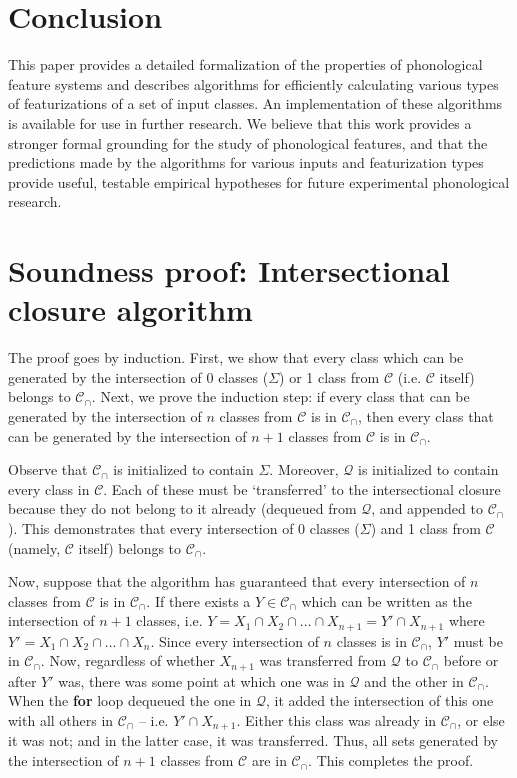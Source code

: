 \documentclass[11pt, oneside]{article}   	%
\begin{document}
\section{Conclusion}

This paper provides a detailed formalization of the properties of phonological feature systems and describes algorithms for efficiently calculating various types of featurizations of a set of input classes. An implementation of these algorithms is available for use in further research. We believe that this work provides a stronger formal grounding for the study of phonological features, and that the predictions made by the algorithms for various inputs and featurization types provide useful, testable empirical hypotheses for future experimental phonological research.

\appendix

\section{Soundness proof: Intersectional closure algorithm}

The proof goes by induction. First, we show that every class which can be generated by the intersection of $0$ classes ($\Sigma$) or 1 class from $\mathcal C$ (i.e. $\mathcal C$ itself) belongs to $\mathcal C_\cap$. Next, we prove the induction step: if every class that can be generated by the intersection of $n$ classes from $\mathcal C$ is in $\mathcal C_\cap$, then every class that can be generated by the intersection of $n+1$ classes from $\mathcal C$ is in $\mathcal C_\cap$.

Observe that $\mathcal C_\cap$ is initialized to contain $\Sigma$. Moreover, $\mathcal Q$ is initialized to contain every class in $\mathcal C$. Each of these must be `transferred' to the intersectional closure because they do not belong to it already (dequeued from $\mathcal Q$, and appended to $\mathcal C_\cap$). This demonstrates that every intersection of 0 classes ($\Sigma$) and 1 class from $\mathcal C$ (namely, $\mathcal C$ itself) belongs to $\mathcal C_\cap$.

Now, suppose that the algorithm has guaranteed that every intersection of $n$ classes from $\mathcal C$ is in $\mathcal C_\cap$. If there exists a $Y \in \mathcal C_\cap$ which can be written as the intersection of $n+1$ classes, i.e. $Y = X_1 \cap X_2 \cap \ldots \cap X_{n+1} = Y' \cap X_{n+1}$ where $Y' = X_1 \cap X_2 \cap \ldots \cap X_n$. Since every intersection of $n$ classes is in $\mathcal C_\cap$, $Y'$ must be in $\mathcal C_\cap$. Now, regardless of whether $X_{n+1}$ was transferred from $\mathcal Q$ to $\mathcal C_\cap$ before or after $Y'$ was, there was some point at which one was in $\mathcal Q$ and the other in $\mathcal C_\cap$. When the \textbf{for} loop dequeued the one in $\mathcal Q$, it added the intersection of this one with all others in $\mathcal C_\cap$ -- i.e. $Y' \cap X_{n+1}$. Either this class was already in $\mathcal C_\cap$, or else it was not; and in the latter case, it was transferred. Thus, all sets generated by the intersection of $n+1$ classes from $\mathcal C$ are in $\mathcal C_\cap$. This completes the proof.
\end{document}
